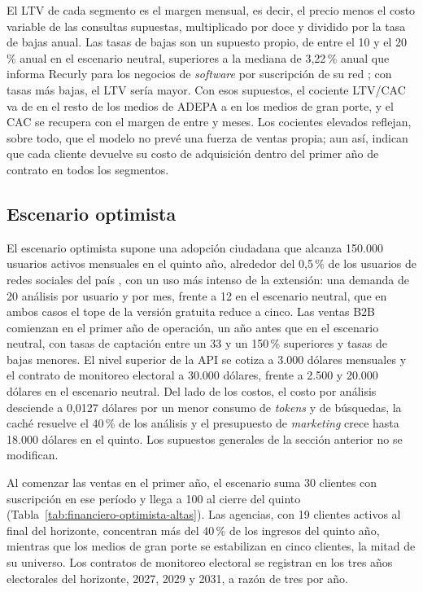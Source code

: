 El LTV de cada segmento es el margen mensual, es decir, el precio menos el costo variable de las consultas supuestas, multiplicado por doce y dividido por la tasa de bajas anual. Las tasas de bajas son un supuesto propio, de entre el 10 y el 20\,\% anual en el escenario neutral, superiores a la mediana de 3,22\,\% anual que informa Recurly para los negocios de \textit{software} por suscripción de su red \parencite{Recurly2026}; con tasas más bajas, el LTV sería mayor. Con esos supuestos, el cociente LTV/CAC va de \finLtvCacMin{} en el resto de los medios de ADEPA a \finLtvCacMax{} en los medios de gran porte, y el CAC se recupera con el margen de entre \finPaybackCacMin{} y \finPaybackCacMax{} meses. Los cocientes elevados reflejan, sobre todo, que el modelo no prevé una fuerza de ventas propia; aun así, indican que cada cliente devuelve su costo de adquisición dentro del primer año de contrato en todos los segmentos.



\subsection{Escenario optimista}

El escenario optimista supone una adopción ciudadana que alcanza 150.000 usuarios activos mensuales en el quinto año, alrededor del 0,5\,\% de los usuarios de redes sociales del país \parencite{DataReportal2024}, con un uso más intenso de la extensión: una demanda de 20 análisis por usuario y por mes, frente a 12 en el escenario neutral, que en ambos casos el tope de la versión gratuita reduce a cinco. Las ventas B2B comienzan en el primer año de operación, un año antes que en el escenario neutral, con tasas de captación entre un 33 y un 150\,\% superiores y tasas de bajas menores. El nivel superior de la API se cotiza a 3.000 dólares mensuales y el contrato de monitoreo electoral a 30.000 dólares, frente a 2.500 y 20.000 dólares en el escenario neutral. Del lado de los costos, el costo por análisis desciende a 0,0127 dólares por un menor consumo de \textit{tokens} y de búsquedas, la caché resuelve el 40\,\% de los análisis y el presupuesto de \textit{marketing} crece hasta 18.000 dólares en el quinto. Los supuestos generales de la sección anterior no se modifican.

Al comenzar las ventas en el primer año, el escenario suma 30 clientes con suscripción en ese período y llega a 100 al cierre del quinto (Tabla~\ref{tab:financiero-optimista-altas}). Las agencias, con 19 clientes activos al final del horizonte, concentran más del 40\,\% de los ingresos del quinto año, mientras que los medios de gran porte se estabilizan en cinco clientes, la mitad de su universo. Los contratos de monitoreo electoral se registran en los tres años electorales del horizonte, 2027, 2029 y 2031, a razón de tres por año.

